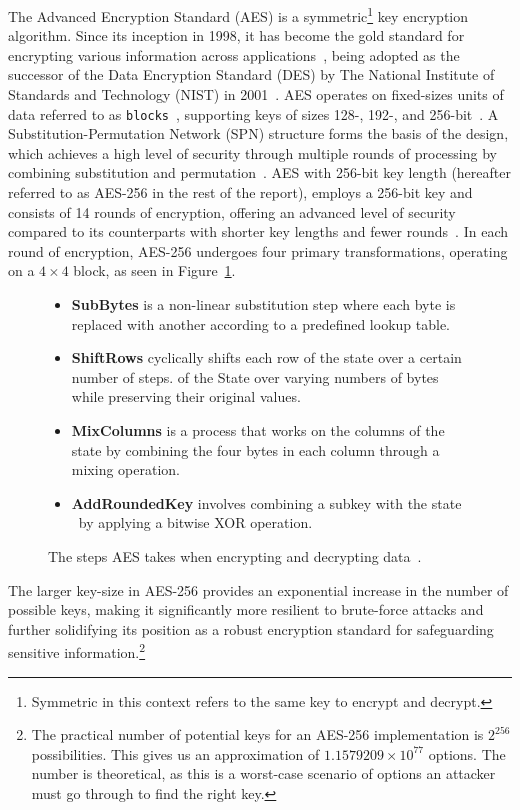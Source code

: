 The Advanced Encryption Standard (AES) is a symmetric\footnote{
  Symmetric in this context refers to the same key to encrypt and
  decrypt.
} key encryption algorithm.
Since its inception in 1998, it has become the gold standard for encrypting various
information across applications~\cite{schneier2015applied,rijndael_book}, being
adopted as the successor of the Data Encryption Standard (DES) by The National
Institute of Standards and Technology (NIST) in 2001~\cite{nist_aes_winner}.
AES operates on fixed-sizes units of data referred to as \texttt{blocks}~\cite{nistfips197blocks},
supporting keys of sizes 128-, 192-, and 256-bit~\cite{nistfips197intro}.
A Substitution-Permutation Network (SPN) structure forms the basis of the design,
which achieves a high level of security through multiple rounds of processing by
combining substitution and permutation~\cite{nistfips197specification}.
AES with 256-bit key length (hereafter referred to as AES-256 in the rest
of the report), employs a 256-bit key and consists of 14 rounds of encryption,
offering an advanced level of security compared to its counterparts with shorter
key lengths and fewer rounds~\cite{nistfips197256}.
In each round of encryption, AES-256 undergoes four primary transformations,
operating on a $4\times4$ block, as seen in Figure~\ref{fig:aessteps}.
\begin{figure}[htbp]
  \begin{itemize}
    \item \textbf{SubBytes} is a non-linear substitution step where each byte is
    replaced with another according to a predefined lookup table.
    \item \textbf{ShiftRows} cyclically shifts each row of the state over a
    certain number of steps.
    of the State over varying numbers of bytes while preserving their original
    values.
    \item \textbf{MixColumns} is a process that works on the columns of the
    state by combining the four bytes in each column through a mixing operation.
    \item \textbf{AddRoundedKey} involves combining a subkey with the state\protect\footnotemark
    ~by applying a bitwise XOR operation.
  \end{itemize}
  \caption{The steps AES takes when encrypting and decrypting data~\cite{nistfips197specification}.}
  \label{fig:aessteps}
\end{figure}
\newline
The larger key-size in AES-256 provides an exponential increase in the number of
possible keys, making it significantly more resilient to brute-force attacks
and further solidifying its position as a robust encryption standard for
safeguarding sensitive information.\footnote{
  The practical number of potential keys for an AES-256 implementation is
  $2^{256}$ possibilities. This gives us an approximation of $1.1579209 \times 10^{77}$
  options.
  The number is theoretical, as this is a worst-case scenario of options an
  attacker must go through to find the right key.
}

